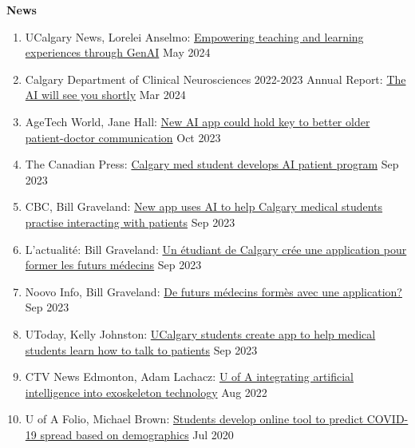 \documentclass{article}
\begin{document}
\textbf{News} \vspace{.5em}
\begin{enumerate}
    \item UCalgary News, Lorelei Anselmo: \href{https://ucalgary.ca/news/empowering-teaching-and-learning-experiences-through-genai}{Empowering teaching and learning experiences through GenAI} \hfill May 2024
    \item Calgary Department of Clinical Neurosciences 2022-2023 Annual Report: \href{https://cumming.ucalgary.ca/departments/dcns/about/annual-reports}{The AI will see you shortly} \hfill Mar 2024
    \item AgeTech World, Jane Hall: \href{https://agetechworld-co-uk.cdn.ampproject.org/c/s/agetechworld.co.uk/news/new-ai-app-could-hold-key-to-better-older-patient-doctor-communication/?amp=1}{New AI app could hold key to better older patient-doctor communication} \hfill Oct 2023
    \item The Canadian Press: \href{https://www.youtube.com/watch?v=e8d3D5-pBSM&ab_channel=TheCanadianPress}{Calgary med student develops AI patient program} \hfill Sep 2023
    \item CBC, Bill Graveland: \href{https://www.cbc.ca/news/canada/calgary/ai-calgary-medical-students-app-skills-1.6975645}{New app uses AI to help Calgary medical students practise interacting with patients} \hfill Sep 2023
    \item L'actualit\'e: Bill Graveland: \href{https://lactualite.com/actualites/un-etudiant-de-calgary-cree-une-application-pour-former-les-futurs-medecins/}{Un \'etudiant de Calgary crée une application pour former les futurs m\'edecins} \hfill Sep 2023
    \item Noovo Info, Bill Graveland: \href{https://www.noovo.info/nouvelle/de-futurs-medecins-formes-avec-une-application.html}{De futurs m\'edecins form\`es avec une application?} \hfill Sep 2023
    \item UToday, Kelly Johnston: \href{https://cumming.ucalgary.ca/news/ucalgary-students-create-app-help-medical-students-learn-how-talk-patients}{UCalgary students create app to help medical students learn how to talk to patients} \hfill Sep 2023
    \item CTV News Edmonton, Adam Lachacz: \href{U of A integrating artificial intelligence into exoskeleton technology}{U of A integrating artificial intelligence into exoskeleton technology} \hfill Aug 2022
    \item U of A Folio, Michael Brown: \href{https://www.ualberta.ca/folio/2020/07/students-develop-online-tool-to-predict-covid-19-spread-based-on-demographics.html}{Students develop online tool to predict COVID-19 spread based on demographics} \hfill Jul 2020

\end{enumerate}
\end{document}

